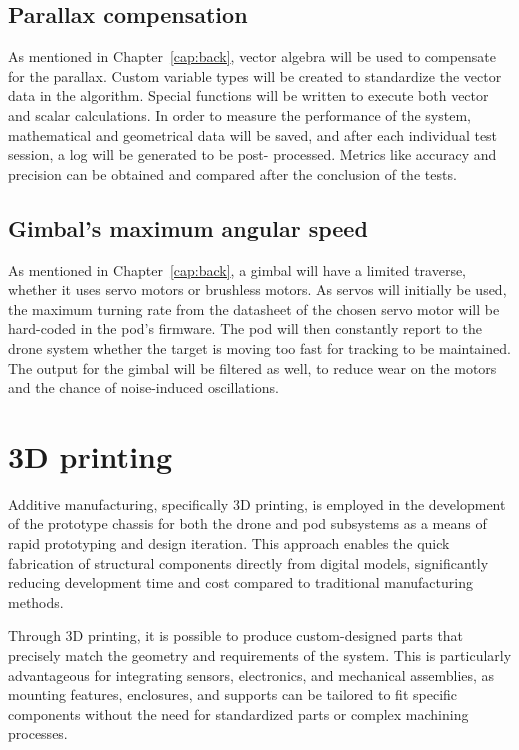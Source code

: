 \subsection{Parallax compensation}

As mentioned in Chapter~\ref{cap:back}, vector algebra will be used to compensate
for the parallax.
Custom variable types will be created to standardize the vector data in the algorithm.
Special functions will be written to execute both vector and scalar calculations.
In order to measure the performance of the system, mathematical and geometrical data will
be saved, and after each individual test session, a log will be generated to be post-%
processed. Metrics like accuracy and precision can be obtained and compared after
the conclusion of the tests.

\subsection{Gimbal's maximum angular speed}

As mentioned in Chapter~\ref{cap:back}, a gimbal will have a limited traverse, whether
it uses
servo motors or brushless motors. As servos will initially be used, the maximum turning
rate from the datasheet of the chosen servo motor will be hard-coded in the pod's firmware.
The pod will then constantly report to the drone system whether the target is moving too
fast for tracking to be maintained. The output for the gimbal
will be filtered as well, to reduce wear on the motors and the chance of noise-induced
oscillations.

\section{3D printing}

Additive manufacturing, specifically 3D printing, is employed in the development of the
prototype chassis for both the drone and pod subsystems as a means of rapid prototyping
and design iteration. This approach enables the quick fabrication of structural
components directly from digital models, significantly reducing development time and
cost compared to traditional manufacturing methods.

Through 3D printing, it is possible to produce custom-designed parts that precisely
match the geometry and requirements of the system. This is particularly advantageous for
integrating sensors, electronics, and mechanical assemblies, as mounting features,
enclosures, and supports can be tailored to fit specific components without the need for
standardized parts or complex machining processes.

